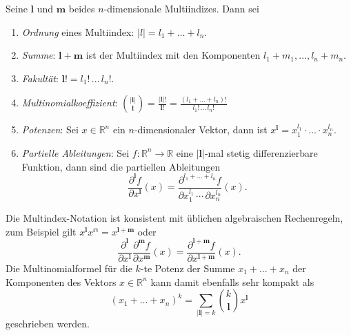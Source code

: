 \begin{definition}
Seine $\mathbf{l}$ und $\mathbf{m}$ beides $n$-dimensionale Multiindizes.
Dann sei
\begin{enumerate}
\item {\em Ordnung} eines Multiindex: $|l|=l_1+\dots+l_n$.
\item {\em Summe}: $\mathbf{l}+\mathbf{m}$ ist der Multiindex mit
den Komponenten $l_1+m_1,\dots,l_n+m_n$.
\item {\em Fakultät}: $\mathbf{l}! = l_1!\, \dots\, l_n!$.
\item {\em Multinomialkoeffizient}: $\displaystyle
\binom{|\mathbf{l}|}{\mathbf{l}}
=
\frac{|\mathbf{l}|!}{\mathbf{l}!}
=
\frac{(l_1+\dots+l_n)!}{l_1!\,\dots\,l_n!}
$
\item {\em Potenzen}: Sei $x\in\mathbb{R}^n$ ein $n$-dimensionaler Vektor,
dann ist $x^{\mathbf{l}} = x_1^{l_1}\cdot\ldots\cdot x_n^{l_n}$.
\item {\em Partielle Ableitungen}: Sei $f\colon\mathbb{R}^n\to\mathbb{R}$
eine $|\mathbf{l}|$-mal stetig differenzierbare Funktion, dann sind die
partiellen Ableitungen
\[
\frac{\partial^{\mathbf{l}} f}{\partial x^{\mathbf{l}}}(x)
=
\frac{\partial^{l_1+\dots+l_n} f}{\partial x_1^{l_1}\,\cdots\,\partial x_n^{l_n}}(x).
\]
\end{enumerate}
\end{definition}
Die Multindex-Notation ist konsistent mit üblichen algebraischen
Rechenregeln, zum Beispiel gilt
$x^{\mathbf{l}}x^{\mathbb{m}}=x^{\mathbf{l}+\mathbf{m}}$
oder 
\[
\frac{\partial^{\mathbf{l}}}{\partial x^{\mathbf{l}}}
\frac{\partial^{\mathbf{m}}f}{\partial x^{\mathbf{m}}}(x)
=
\frac{\partial^{\mathbf{l}+\mathbf{m}}f}{\partial x^{\mathbf{l}+\mathbf{m}}}(x).
\]
Die Multinomialformel für die $k$-te Potenz der Summe
$x_1+\dots+x_n$ der Komponenten des Vektors $x\in\mathbb{R}^n$
kann damit ebenfalls sehr kompakt als
\[
(x_1+\dots+x_n)^{k}
=
\sum_{|\mathbf{l}|=k}
\binom{k}{\mathbf{l}} x^{\mathbf{l}}
\]
geschrieben werden.

%
%
